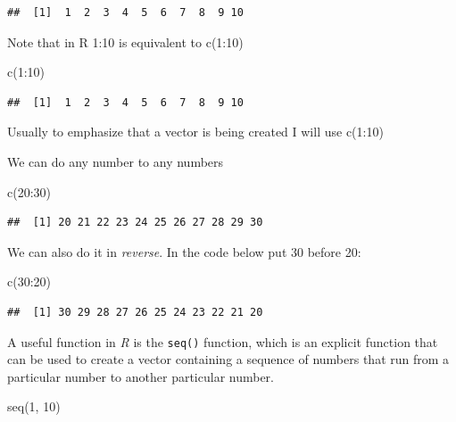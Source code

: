 \documentclass[
]{book}
\newenvironment{Shaded}{\begin{snugshade}}{\end{snugshade}}
\newcommand{\DecValTok}[1]{\textcolor[rgb]{0.00,0.00,0.81}{#1}}
\newcommand{\FunctionTok}[1]{\textcolor[rgb]{0.00,0.00,0.00}{#1}}
\newcommand{\NormalTok}[1]{#1}
\newcommand{\SpecialCharTok}[1]{\textcolor[rgb]{0.00,0.00,0.00}{#1}}
\begin{document}
\begin{verbatim}
##  [1]  1  2  3  4  5  6  7  8  9 10
\end{verbatim}

Note that in R 1:10 is equivalent to c(1:10)

\begin{Shaded}
\begin{Highlighting}[]
\FunctionTok{c}\NormalTok{(}\DecValTok{1}\SpecialCharTok{:}\DecValTok{10}\NormalTok{)}
\end{Highlighting}
\end{Shaded}

\begin{verbatim}
##  [1]  1  2  3  4  5  6  7  8  9 10
\end{verbatim}

Usually to emphasize that a vector is being created I will use c(1:10)

We can do any number to any numbers

\begin{Shaded}
\begin{Highlighting}[]
\FunctionTok{c}\NormalTok{(}\DecValTok{20}\SpecialCharTok{:}\DecValTok{30}\NormalTok{)}
\end{Highlighting}
\end{Shaded}

\begin{verbatim}
##  [1] 20 21 22 23 24 25 26 27 28 29 30
\end{verbatim}

We can also do it in \emph{reverse}. In the code below put 30 before 20:

\begin{Shaded}
\begin{Highlighting}[]
\FunctionTok{c}\NormalTok{(}\DecValTok{30}\SpecialCharTok{:}\DecValTok{20}\NormalTok{)}
\end{Highlighting}
\end{Shaded}

\begin{verbatim}
##  [1] 30 29 28 27 26 25 24 23 22 21 20
\end{verbatim}

A useful function in \emph{R} is the \texttt{seq()} function, which is an explicit function that can be used to create a vector containing a sequence of numbers that run from a particular number to another particular number.

\begin{Shaded}
\begin{Highlighting}[]
\FunctionTok{seq}\NormalTok{(}\DecValTok{1}\NormalTok{, }\DecValTok{10}\NormalTok{)}
\end{Highlighting}
\end{Shaded}
\end{document}
